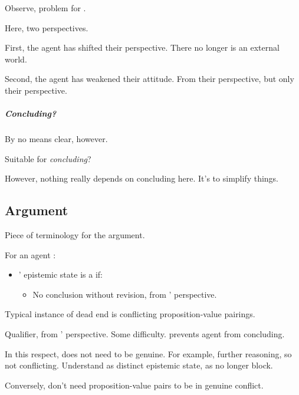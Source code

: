 \begin{note}
  Observe, problem for \citeauthor{Descartes:1996vp}.

  Here, two perspectives.

  First, the agent has shifted their perspective.
  There no longer is an external world.

  Second, the agent has weakened their attitude.
  From their perspective, but only their perspective.
\end{note}

\subparagraph{Concluding?}

\begin{note}
  By no means clear, however.

  Suitable for \emph{concluding}?
\end{note}

\begin{note}
  However, nothing really depends on concluding here.
  It's to simplify things.
\end{note}

\subsection{Argument}
\label{sec:argument}

\begin{note}[A \deadEnd{}]
  Piece of terminology for the argument.

  \begin{definition}[A \deadEnd{0}]
    \label{def:dead-end}
    For an agent \vAgent{}:

    \begin{itemize}
    \item
      \vAgent{}' epistemic state is a \emph{} if:
      \begin{itemize}
      \item
        No conclusion without revision, from \vAgent{}' perspective.
      \end{itemize}
    \end{itemize}
    \vspace{-\baselineskip}
  \end{definition}

  Typical instance of dead end is conflicting proposition-value pairings.

  Qualifier, from \vAgent{}' perspective.
  Some difficulty.
  \deadEnd{} prevents agent from concluding.

  In this respect, \deadEnd{} does not need to be genuine.
  For example, further reasoning, so not conflicting.
  Understand as distinct epistemic state, as no longer block.

  Conversely, don't need proposition-value pairs to be in genuine conflict.
\end{note}


